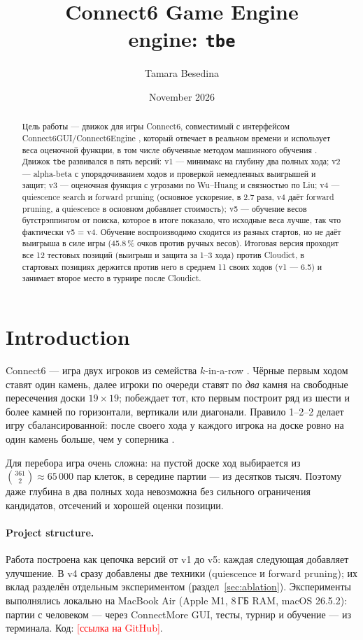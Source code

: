 \documentclass[a4paper,10pt,twocolumn]{article}
\title{\textbf{Connect6 Game Engine}\\[0.3em]\large engine: \texttt{tbe}}
\author{Tamara Besedina}
\date{November 2026}
\newcommand{\todo}[1]{\textcolor{red}{[#1]}}
\newcommand{\code}[1]{\texttt{#1}}
\begin{document}
\maketitle
\begin{abstract}
\noindent
Цель работы --- движок для игры Connect6, совместимый с интерфейсом Connect6GUI/\allowbreak{}Connect6Engine \citep{connect6gui}, который отвечает в реальном времени и использует веса оценочной функции, в том числе обученные методом машинного обучения \citep{statement}. Движок \code{tbe} развивался в пять версий: v1 --- минимакс на глубину два полных хода; v2 --- alpha-beta с упорядочиванием ходов и проверкой немедленных выигрышей и защит; v3 --- оценочная функция с угрозами по Wu--Huang и связностью по Liu; v4 --- quiescence search и forward pruning (основное ускорение, в 2.7 раза, v4 даёт forward pruning, а quiescence в основном добавляет стоимость); v5 --- обучение весов бутстрэппингом от поиска, которое в итоге показало, что исходные веса лучше, так что фактически v5 = v4. Обучение воспроизводимо сходится из разных стартов, но не даёт выигрыша в силе игры (45.8\,\% очков против ручных весов). Итоговая версия проходит все 12 тестовых позиций (выигрыш и защита за 1--3 хода) против Cloudict, в стартовых позициях держится против него в среднем 11 своих ходов (v1 --- 6.5) и занимает второе место в турнире после Cloudict.
\end{abstract}

\section{Introduction}

Connect6 --- игра двух игроков из семейства $k$-in-a-row \citep{wu2005family}. Чёрные первым ходом ставят один камень, далее игроки по очереди ставят по \emph{два} камня на свободные пересечения доски $19\times19$; побеждает тот, кто первым построит ряд из шести и более камней по горизонтали, вертикали или диагонали. Правило 1--2--2 делает игру сбалансированной: после своего хода у каждого игрока на доске ровно на один камень больше, чем у соперника \citep{wu2005family}.

Для перебора игра очень сложна: на пустой доске ход выбирается из $\binom{361}{2}\approx 65\,000$ пар клеток, в середине партии --- из десятков тысяч. Поэтому даже глубина в два полных хода невозможна без сильного ограничения кандидатов, отсечений и хорошей оценки позиции.

\paragraph{Project structure.} Работа построена как цепочка версий от v1 до v5: каждая следующая добавляет улучшение. В v4 сразу добавлены две техники (quiescence и forward pruning); их вклад разделён отдельным экспериментом (раздел~\ref{sec:ablation}). Эксперименты выполнялись локально на MacBook Air (Apple M1, 8\,ГБ RAM, macOS 26.5.2): партии с человеком --- через ConnectMore GUI, тесты, турнир и обучение --- из терминала. Код: \todo{ссылка на GitHub}.
\end{document}
